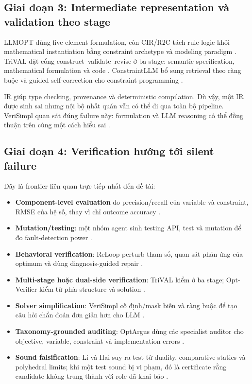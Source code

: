 \documentclass[11pt,a4paper]{article}
\begin{document}
\subsection{Giai đoạn 3: Intermediate representation và validation theo stage}

LLMOPT dùng five-element formulation, còn CIR/R2C tách rule logic khỏi mathematical instantiation bằng constraint archetype và modeling paradigm \parencite{jiang2024llmopt,lyu2026cir}. TriVAL đặt cổng construct--validate--revise ở ba stage: semantic specification, mathematical formulation và code \parencite{fang2026trival}. ConstraintLLM bổ sung retrieval theo ràng buộc và guided self-correction cho constraint programming \parencite{shi2025constraintllm}.

IR giúp type checking, provenance và deterministic compilation. Dù vậy, một IR được sinh sai nhưng nội bộ nhất quán vẫn có thể đi qua toàn bộ pipeline. VeriSimpl quan sát đúng failure này: formulation và LLM reasoning có thể đồng thuận trên cùng một cách hiểu sai \parencite{rahman2026verisimpl}.

\subsection{Giai đoạn 4: Verification hướng tới silent failure}

Đây là frontier liên quan trực tiếp nhất đến đề tài:

\begin{itemize}
  \item \textbf{Component-level evaluation} đo precision/recall của variable và constraint, RMSE của hệ số, thay vì chỉ outcome accuracy \parencite{refai2025component}.
  \item \textbf{Mutation/testing}: một nhóm agent sinh testing API, test và mutation để đo fault-detection power \parencite{zadorojniy2025validation}.
  \item \textbf{Behavioral verification}: ReLoop perturb tham số, quan sát phản ứng của optimum và dùng diagnosis-guided repair \parencite{lian2026reloop}.
  \item \textbf{Multi-stage hoặc dual-side verification}: TriVAL kiểm ở ba stage; Opt-Verifier kiểm từ phía structure và solution \parencite{fang2026trival,liu2026optverifier}.
  \item \textbf{Solver simplification}: VeriSimpl cố định/mask biến và ràng buộc để tạo câu hỏi chẩn đoán đơn giản hơn cho LLM \parencite{rahman2026verisimpl}.
  \item \textbf{Taxonomy-grounded auditing}: OptArgus dùng các specialist auditor cho objective, variable, constraint và implementation errors \parencite{li2026optargus}.
  \item \textbf{Sound falsification}: Li và Hai suy ra test từ duality, comparative statics và polyhedral limits; khi một test sound bị vi phạm, đó là certificate rằng candidate không trung thành với role đã khai báo \parencite{li2026falsification}.
\end{itemize}
\end{document}

